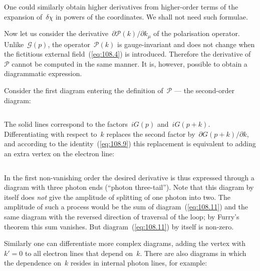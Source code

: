 One could similarly obtain higher derivatives from higher-order terms of the expansion of~$\delta\chi$ in powers of the coordinates. We shall not need such formulae.

Now let us consider the derivative~$\partial\mathcal{P}(k)/\partial k_\mu$ of the polarisation operator. Unlike~$\mathcal{G}(p)$, the operator~$\mathcal{P}(k)$ is gauge-invariant and does not change when the fictitious external field~(\ref{eq:108.4}) is introduced. Therefore the derivative of~$\mathcal{P}$ cannot be computed in the same manner. It is, however, possible to obtain a diagrammatic expression.

Consider the first diagram entering the definition of~$\mathcal{P}$ --- the second-order diagram:

\begin{equation}
\label{eq:108.10}
\end{equation}

\noindent The solid lines correspond to the factors~$iG(p)$ and~$iG(p + k)$. Differentiating with respect to~$k$ replaces the second factor by~$\partial G(p + k)/\partial k$, and according to the identity~(\ref{eq:108.9}) this replacement is equivalent to adding an extra vertex on the electron line:

\begin{equation}
\label{eq:108.11}
\end{equation}

\noindent In the first non-vanishing order the desired derivative is thus expressed through a diagram with three photon ends (``photon three-tail''). Note that this diagram by itself does \emph{not} give the amplitude of splitting of one photon into two. The amplitude of such a process would be the sum of diagram~(\ref{eq:108.11}) and the same diagram with the reversed direction of traversal of the loop; by Furry's theorem this sum vanishes. But diagram~(\ref{eq:108.11}) by itself is non-zero.


Similarly one can differentiate more complex diagrams, adding the vertex with~$k' = 0$ to all electron lines that depend on~$k$. There are also diagrams in which the dependence on~$k$ resides in internal photon lines, for example:


